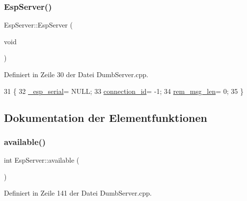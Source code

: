 \subsubsection{\texorpdfstring{Esp\+Server()}{EspServer()}}
{\footnotesize\ttfamily Esp\+Server\+::\+Esp\+Server (\begin{DoxyParamCaption}\item[{void}]{ }\end{DoxyParamCaption})}



Definiert in Zeile 30 der Datei Dumb\+Server.\+cpp.


\begin{DoxyCode}
31 \{
32   \hyperlink{class_esp_server_a33166aa92db341d47cdf1776492cca62}{\_esp\_serial}= NULL;
33   \hyperlink{class_esp_server_ab601ba8cdf21497e04e862f22e52c590}{connection\_id}= -1;
34   \hyperlink{class_esp_server_a0cff51089b75a6edf347b86727683e7f}{rem\_msg\_len}= 0;
35 \}
\end{DoxyCode}


\subsection{Dokumentation der Elementfunktionen}
\mbox{\label{class_esp_server_aad68b4972f6b8426004feeef6e98d02d}} 
\subsubsection{\texorpdfstring{available()}{available()}}
{\footnotesize\ttfamily int Esp\+Server\+::available (\begin{DoxyParamCaption}{ }\end{DoxyParamCaption})\hspace{0.3cm}{\ttfamily [virtual]}}



Definiert in Zeile 141 der Datei Dumb\+Server.\+cpp.



